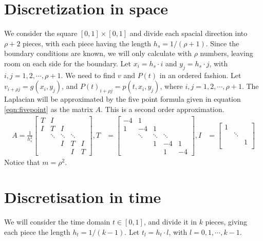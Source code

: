 \section{Discretization in space} \label{sec:space}
We consider the square $[0,1] \times [0,1]$ and divide each spacial direction into $\rho+2$ pieces, with each piece having the length $h_s = 1/(\rho+1)$. Since the boundary conditions are known, we will only calculate with $\rho$ numbers, leaving room on each side for the boundary. Let $x_i = h_s \cdot i$ and $y_j = h_s \cdot j$, with $i,j =1,2,\cdots, \rho + 1 $. We need to find $v$ and $P(t)$ in an ordered fashion. Let  $v_{i+\rho j} = g(x_i, y_j)$, and 
$P(t)_{i+\rho j} = p(t,x_i, y_j)$, where $i,j = 1,2,\cdots, \rho+1$.
The Laplacian will be approximated by the five point formula given in equation \eqref{eqn:fivepoint} as the matrix $A$. This is a second order approximation.
\begin{equation} \label{eqn:fivepoint} 
\begin{aligned} 
A = \frac{1}{h_s^2} 
\begin{bmatrix}
T & I & & &\\
I& T & I & &\\
& \ddots & \ddots & \ddots & \\
& & I& T & I\\
& & & I & T
\end{bmatrix}
, T  &= 
\begin{bmatrix}
-4 & 1 & & &\\
1 & -4 & 1 & &  \\
& \ddots & \ddots & \ddots & \\
&  & 1 & -4 & 1 \\
 & & & 1 & -4
\end{bmatrix},
I &= 
\begin{bmatrix}
1 & &\\
& \ddots & \\
& & 1 \\
\end{bmatrix}
\end{aligned}
\end{equation}
Notice that $m = \rho ^2$.

\section{Discretisation in time} \label{sec:time}
We will consider the time domain $t \in [0,1] $, and divide it in $k$ pieces, giving each piece the length $h_t = 1/(k-1)$. Let $t_l = h_t\cdot l$, with $l = 0,1,\cdots,k-1 $.\\


